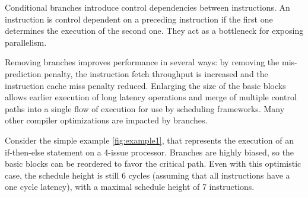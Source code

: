 Conditional branches introduce control dependencies between instructions. An instruction is control dependent on a preceding instruction if the first one determines the execution of the second one. They act as a bottleneck for exposing parallelism.

Removing branches improves performance in several ways: by removing the mis-prediction penalty, the instruction fetch throughput is increased and the instruction cache miss penalty reduced. Enlarging the size of the basic blocks allows earlier execution of long latency operations and merge of multiple control paths into a single flow of execution for use by scheduling frameworks. Many other compiler optimizations are impacted by branches. 

Consider the simple example \ref{fig:example1}, that represents the execution of an if-then-else statement on a 4-issue processor. Branches are highly biased, so the basic blocks can be reordered to favor the critical path. Even with this optimistic case, the schedule height is still 6 cycles (assuming that all instructions have a one cycle latency), with a maximal schedule height of 7 instructions. 


